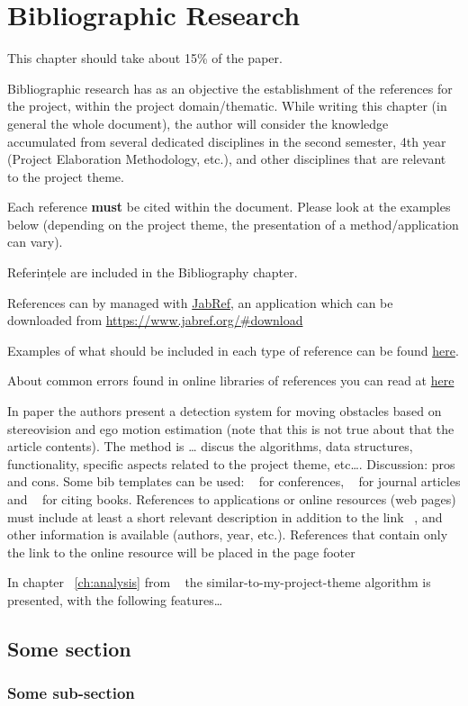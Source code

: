 \chapter{Bibliographic Research}\label{ch:studiubib}

\pagestyle{fancy}


{\color{blue}\noindent This chapter should take about 15\% of the paper.\\}

Bibliographic research has as an objective the establishment of the references for the project, within the project domain/thematic. While writing this chapter (in general the whole document), the author will consider the knowledge accumulated from several dedicated disciplines in the second semester, 4th year (Project Elaboration Methodology, etc.), and other disciplines that are relevant to the project theme.

Each reference \textbf{must} be cited within the document. Please look at the examples below (depending on the project theme, the presentation of a method/application can vary).

Referințele are included in the Bibliography chapter. 

References can by managed with \href{https://www.jabref.org/}{JabRef}, an application which can be downloaded from \url{https://www.jabref.org/#download}

Examples of what should be included in each type of reference can be found \href{https://libguides.nps.edu/citation/ieee-bibtex}{here}.

About common errors found in online libraries of references you can read at \href{https://www.ece.ucdavis.edu/~jowens/biberrors.html}{here}

In paper \cite{BellucciLZ04} the authors present a detection system for moving obstacles based on stereovision and ego motion estimation (note that this is not true about that the article contents). The method is … discus the algorithms, data structures, functionality, specific aspects related to the project theme, etc…. Discussion: pros and cons. Some bib templates can be used: ~\cite{BellucciLZ04} for conferences, ~\cite{AntoniouSBDB07} for journal articles and ~\cite{russell1995artificial} for citing books.  References to applications or online resources (web pages) must include at least a short relevant description in addition to the link ~\cite{webpage}, and other information is available (authors, year, etc.). References that contain only the link to the online resource will be placed in the page footer

In chapter ~\ref{ch:analysis} from ~\cite{strunk} the similar-to-my-project-theme algorithm is presented, with the following features…



\section{Some section}

\subsection{Some sub-section}
\lipsum[2-9]
